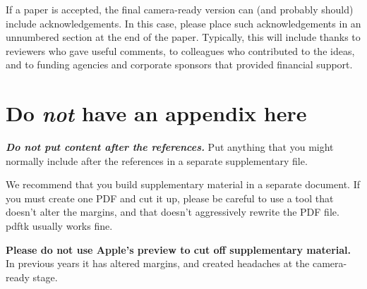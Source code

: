 \documentclass{article}
\begin{document}
If a paper is accepted, the final camera-ready version can (and
probably should) include acknowledgements. In this case, please
place such acknowledgements in an unnumbered section at the
end of the paper. Typically, this will include thanks to reviewers
who gave useful comments, to colleagues who contributed to the ideas,
and to funding agencies and corporate sponsors that provided financial
support.


\nocite{langley00}





\appendix
\section{Do \emph{not} have an appendix here}

\textbf{\emph{Do not put content after the references.}}
%
Put anything that you might normally include after the references in a separate
supplementary file.

We recommend that you build supplementary material in a separate document.
If you must create one PDF and cut it up, please be careful to use a tool that
doesn't alter the margins, and that doesn't aggressively rewrite the PDF file.
pdftk usually works fine. 

\textbf{Please do not use Apple's preview to cut off supplementary material.} In
previous years it has altered margins, and created headaches at the camera-ready
stage. 
\end{document}
